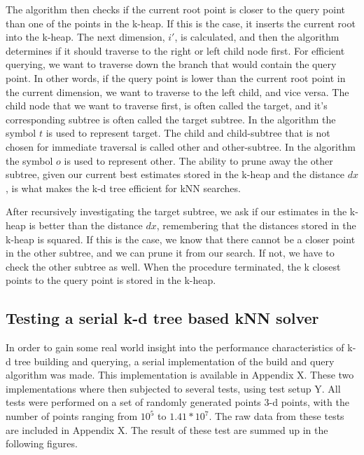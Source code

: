 The algorithm then checks if the current root point is closer to the query point than one of the points in the k-heap. If this is the case, it inserts the current root into the k-heap. The next dimension, $i'$, is calculated, and then the algorithm determines if it should traverse to the right or left child node first. For efficient querying, we want to traverse down the branch that would contain the query point. In other words, if the query point is lower than the current root point in the current dimension, we want to traverse to the left child, and vice versa. The child node that we want to traverse first, is often called the target, and it's corresponding subtree is often called the target subtree. In the algorithm the symbol $t$ is used to represent target. The child and child-subtree that is not chosen for immediate traversal is called other and other-subtree. In the algorithm the symbol $o$ is used to represent other. The ability to prune away the other subtree, given our current best estimates stored in the k-heap and the distance $dx$, is what makes the k-d tree efficient for kNN searches.

After recursively investigating the target subtree, we ask if our estimates in the k-heap is better than the distance $dx$, remembering that the distances stored in the k-heap is squared. If this is the case, we know that there cannot be a closer point in the other subtree, and we can prune it from our search. If not, we have to check the other subtree as well. When the procedure terminated, the k closest points to the query point is stored in the k-heap.

\subsection{Testing a serial k-d tree based kNN solver} %
\label{sub:testing_a_serial_k_d_tree_based_knn_solver}

In order to gain some real world insight into the performance characteristics of k-d tree building and querying, a serial implementation of the build and query algorithm was made. This implementation is available in Appendix X. These two implementations where then subjected to several tests, using test setup Y. All tests were performed on a set of randomly generated points 3-d points, with the number of points ranging from $10^5$ to $1.41*10^7$. The raw data from these tests are included in Appendix X. The result of these test are summed up in the following figures.

